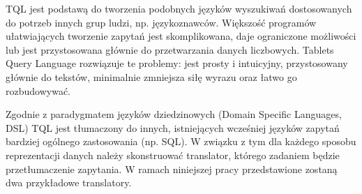 TQL jest podstawą do tworzenia podobnych języków wyszukiwań dostosowanych do potrzeb innych grup ludzi, np. językoznawców.
Większość programów ułatwiających tworzenie zapytań jest skomplikowana, daje ograniczone możliwości lub jest przystosowana głównie do przetwarzania danych liczbowych. Tablets Query Language rozwiązuje te problemy: jest prosty i intuicyjny, przystosowany głównie do tekstów, minimalnie zmniejsza siłę wyrazu oraz łatwo go rozbudowywać. 

Zgodnie z paradygmatem języków dziedzinowych (Domain Specific Languages, DSL) TQL jest tłumaczony do innych, istniejących wcześniej języków zapytań bardziej ogólnego zastosowania (np. SQL).
W związku z tym dla każdego sposobu reprezentacji danych należy skonstruować translator, 
którego zadaniem będzie przetłumaczenie zapytania. 
W ramach niniejszej pracy przedstawione zostaną dwa przykładowe translatory.
